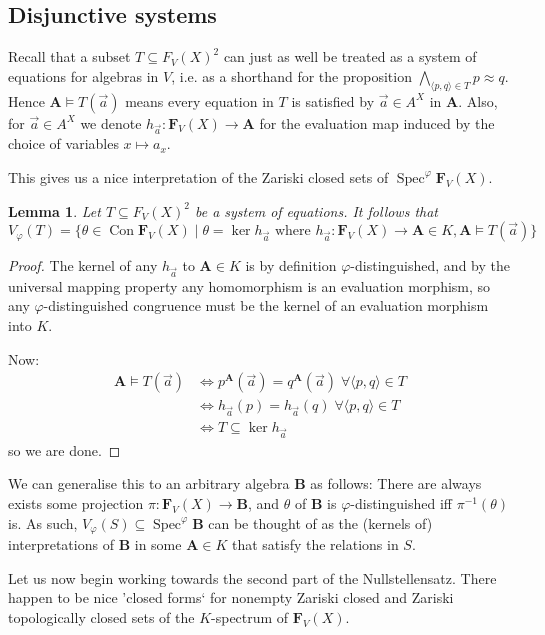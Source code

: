 \documentclass{article}
\theoremstyle{plain}
\newtheorem{lemma}[theorem]{Lemma}
\theoremstyle{definition}
\newcommand{\Spec}{\operatorname{Spec}}
\begin{document}
\subsection{Disjunctive systems}

Recall that a subset $T \subseteq F_V(X)^2$ can just as well be treated as a system of equations for algebras in $V$, i.e. as a shorthand for the proposition $\bigwedge_{\langle p, q \rangle \in T} p \approx q$.
Hence $\mathbf{A} \models T(\vec{a})$ means every equation in $T$ is satisfied by $\vec{a} \in A^X$ in $\mathbf{A}$.
Also, for $\vec{a} \in A^X$ we denote $h_{\vec{a}} \colon \mathbf{F}_V(X) \rightarrow \mathbf{A}$ for the evaluation map induced by the choice of variables $x \mapsto a_x$.

This gives us a nice interpretation of the Zariski closed sets of $\Spec^\varphi\mathbf{F}_V(X)$.

\begin{lemma} \label{lem:closedsetisevalmapker}
    Let $T \subseteq F_V(X)^2$ be a system of equations.
    It follows that
    $$V_\varphi(T) = \{ \theta \in \operatorname{Con}\mathbf{F}_V(X) \mid \theta = \ker h_{\vec{a}} \text{ where } h_{\vec{a}} \colon \mathbf{F}_V(X) \to \mathbf{A} \in K, \mathbf{A} \models T(\vec{a})\}$$
\end{lemma}
\begin{proof}
    The kernel of any $h_{\vec{a}}$ to $\mathbf{A} \in K$ is by definition $\varphi$-distinguished, and by the universal mapping property any homomorphism is an evaluation morphism, so any $\varphi$-distinguished congruence must be the kernel of an evaluation morphism into $K$.\par
    Now:
    \begin{align*}
        \mathbf{A} \models T(\vec{a}) &\iff p^\mathbf{A}(\vec{a}) = q^\mathbf{A}(\vec{a}) \; \forall \langle p, q\rangle \in T\\
        &\iff h_{\vec{a}}(p) = h_{\vec{a}}(q) \; \forall \langle p, q\rangle \in T\\
        &\iff T\subseteq \ker h_{\vec{a}}
    \end{align*}
    so we are done.
\end{proof}

We can generalise this to an arbitrary algebra $\mathbf{B}$ as follows:
There are always exists some projection $\pi \colon \mathbf{F}_V(X) \rightarrow \mathbf{B}$, and $\theta$ of $\mathbf{B}$ is $\varphi$-distinguished iff $\pi^{-1}(\theta)$ is.
As such, $V_\varphi(S)\subseteq \Spec^\varphi\mathbf{B}$ can be thought of as the (kernels of) interpretations of $\mathbf{B}$ in some $\mathbf{A} \in K$ that satisfy the relations in $S$.\par
Let us now begin working towards the second part of the Nullstellensatz.
There happen to be nice 'closed forms` for nonempty Zariski closed and Zariski topologically closed sets of the $K$-spectrum of $\mathbf{F}_V(X)$.
\end{document}
